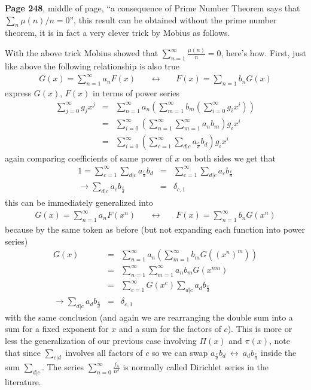 \documentclass[aps,preprint,preprintnumbers,nofootinbib,showpacs,prd]{revtex4-1}
\newcommand{\nbea}{\begin{eqnarray*}}
\newcommand{\neea}{\end{eqnarray*}}
\begin{document}
{\bf Page 248}, middle of page, ``a consequence of Prime Number Theorem says that $\sum_n \mu(n)/n=0$'', this result can be obtained without the prime number theorem, it is in fact a very clever trick by Mobius as follows.

With the above trick Mobius showed that $\sum_{n=1}^\infty \frac{\mu(n)}{n} = 0$, here's how. First, just like above the following relationship is also true
%
\nbea
G(x) = \sum_{n=1}^\infty a_n F(x) &~~~~~\longleftrightarrow~~~~~& F(x) = \sum_{n=1} b_n G(x)
\neea
%
express $G(x)$, $F(x)$ in terms of power series
%
\nbea
\sum_{j=0}^\infty g_j x^j & = & \sum_{n=1}^\infty a_n \left(\sum_{m=1}^\infty b_m \left(\sum_{i=0}^\infty g_i x^i\right)\right) \\
& = &\sum_{i=0}^\infty \left( \sum_{n=1}^\infty\sum_{m=1}^\infty a_n  b_m \right) g_i x^i \\
& = &\sum_{i=0}^\infty \left( \sum_{c=1}^\infty\sum_{d|c} a_{\frac{c}{d}}  b_{d} \right) g_i x^i
\neea
%
again comparing coefficients of same power of $x$ on both sides we get that
%
\nbea
1 = \sum_{c=1}^\infty\sum_{d|c} a_{\frac{c}{d}}  b_{d} & = & \sum_{c=1}^\infty\sum_{d|c} a_c  b_{\frac{c}{d}} \\
\to \sum_{d|c} a_c  b_{\frac{c}{d}} & = & \delta_{c,1}
\neea
%
this can be immediately generalized into
%
\nbea
G(x) = \sum_{n=1}^\infty a_n F(x^n) &~~~~~\longleftrightarrow~~~~~& F(x) = \sum_{n=1}^\infty b_n G(x^n)
\neea
%
because by the same token as before (but not expanding each function into power series)
%
\nbea
G(x) & = & \sum_{n=1}^\infty a_n \left(\sum_{m=1}^\infty b_m G\left (\left(x^n\right)^m\right)\right) \\
& = & \sum_{n=1}^\infty \sum_{m=1}^\infty a_n b_m G(x^{nm}) \\
& = & \sum_{c=1}^\infty G(x^c) \sum_{d|c} a_{d} b_{\frac{c}{d}} \\
\to \sum_{d|c} a_{d} b_{\frac{c}{d}} & = & \delta_{c,1}
\neea
%
with the same conclusion (and again we are rearranging the double sum into a sum for a fixed exponent for $x$ and a sum for the factors of $c$). This is more or less the generalization of our previous case involving $\Pi(x)$ and $\pi(x)$, note that since $\sum_{c|d}$ involves all factors of $c$ so we can swap $a_{\frac{c}{d}}  b_{d} ~\leftrightarrow~ a_d  b_{\frac{c}{d}}$ inside the sum $\sum_{d|c}$. The series $\sum_{n=0}^\infty \frac{f_n}{n^s}$ is normally called Dirichlet series in the literature.
\end{document}
